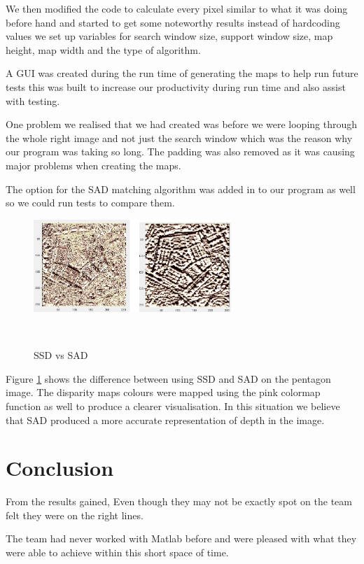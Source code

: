 \documentclass[twocolumn]{article}
\begin{document}
We then modified the code to calculate every pixel similar to what it was doing before hand and started to get some noteworthy results instead of hardcoding values we set up variables for search window size, support window size, map height, map width and the type of algorithm.

A GUI was created during the run time of generating the maps to help run future tests this was built to increase our productivity during run time and also assist with testing. 

One problem we realised that we had created was before we were looping through the whole right image and not just the search window which was the reason why our program was taking so long. The padding was also removed as it was causing major problems when creating the maps.  

The option for the SAD matching algorithm was added in to our program as well so we could run tests to compare them. 

 \begin{figure}[H]
\centering
  \includegraphics[height=35mm]{Figures/SSDvsSAD}
    \caption{SSD vs SAD}~\label{fig:SSDvsSAD}
\end{figure} 

Figure \ref{fig:SSDvsSAD} shows the difference between using SSD and SAD on the pentagon image. The disparity maps colours were mapped using the pink colormap function as well to produce a clearer visualisation. In this situation we believe that SAD produced a more accurate representation of depth in the image. 


 

\section{Conclusion}
\vspace{-1ex}

From the results gained, Even though they may not be exactly spot on the team felt they were on the right lines.

The team had never worked with Matlab before and were pleased with what they were able to achieve within this short space of time. 
 
\end{document}
